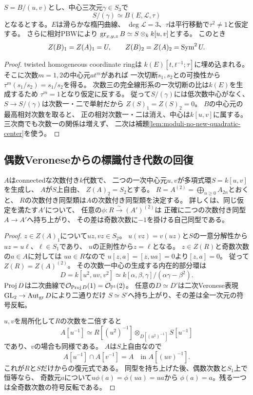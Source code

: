 \begin{lemma}
\label{lem:moduli-low-center}
$S=B/(u,v)$とし、中心三次元$\gamma\in S_3$で
\[
 S/(\gamma)\simeq B(E,\mathcal L,\tau)
\]
となるとする。$E$は滑らかな楕円曲線、
$\deg\mathcal L=3$、$\tau$は平行移動で$\tau^2\ne1$と仮定する。
さらに相対PBWにより
$\operatorname{gr}_{x,y,z} B\simeq S\otimes_k k[u,v]$とする。
このとき
\[
 Z(B)_1=Z(A)_1=U,\qquad
 Z(B)_2=Z(A)_2=\operatorname{Sym}^2U.
\]
\end{lemma}
\begin{proof}
twisted homogeneous coordinate ringは
$k(E)[t,t^{-1};\tau]$に埋め込まれる。
そこに次数$m=1,2$の中心元$at^m$があれば
一次切断$s_1,s_2$との可換性から
$\tau^m(s_1/s_2)=s_1/s_2$を得る。
次数三の完全線形系の一次切断の比は$k(E)$を生成するため
$\tau^m=1$となり仮定に反する。
従って$S/(\gamma)$には低次数中心がなく、
$S\to S/(\gamma)$は次数一・二で単射だから
$Z(S)_1=Z(S)_2=0$。
$B$の中心元の最高相対次数を取ると、
正の相対次数一・二は消え、中心は$k[u,v]$に属する。
三次商でも次数一の関係は増えず、
二次は補題\ref{lem:moduli-no-new-quadratic-center}を使う。
\end{proof}

\subsection{偶数Veroneseからの標識付き代数の回復}
\begin{lemma}[中心二変数の平方根と奇数部分]
\label{lem:moduli-even-veronese}
$A$はconnectedな次数付き$k$代数で、
二つの一次中心元$u,v$が多項式環$S=k[u,v]$を生成し、
$A$が$S$上自由、
$Z(A)_2=S_2$とする。
$R=A^{(2)}=\bigoplus_{n\ge0}A_{2n}$とおくと、
$R$の次数付き同型類は$A$の次数付き同型類を決定する。
詳しくは、同じ仮定を満たす$A'$について、
任意の$\phi:R\xrightarrow{\sim}(A')^{(2)}$は
正確に二つの次数付き同型$A\to A'$へ持ち上がり、
その差は奇数次数に$-1$を掛ける自己同型である。
\end{lemma}
\begin{proof}
$z\in Z(A)_1$について$uz,vz\in S_2$。
$u(vz)=v(uz)$と$S$の一意分解性から
$uz=u\ell$、$\ell\in S_1$であり、
$u$の正則性から$z=\ell$となる。
$z\in Z(R)$と奇数次数の$a\in A$に対しては
$ua\in R$なので
$u[z,a]=[z,ua]=0$より$[z,a]=0$。
従って$Z(R)=Z(A)^{(2)}$。
その次数一中心の生成する内在的部分環は
\[
 D=k[u^2,uv,v^2]
   \simeq k[\alpha,\beta,\gamma]/(\alpha\gamma-\beta^2).
\]
$\operatorname{Proj} D$は二次曲線で$\mathcal O_{\operatorname{Proj} D}(1)=\mathcal O_{\mathbb P^1}(2)$。
任意の$D\simeq D'$は二次Veronese表現
$\mathrm{GL}_2\to\operatorname{Aut}_{\operatorname{gr}}D$により二通りだけ
$S\simeq S'$へ持ち上がり、その差は全一次元の符号反転。

$u,v$を局所化して$R$の次数を二倍すると
\[
 A[u^{-1}]
  \simeq R[(u^2)^{-1}]
    \otimes_{D[(u^2)^{-1}]}S[u^{-1}]
\]
であり、$v$の場合も同様である。
$A$は$S$上自由なので
\[
 A[u^{-1}]\cap A[v^{-1}]=A
 \quad\text{in }A[(uv)^{-1}].
\]
これが$R$と$S$だけからの復元式である。
同型を持ち上げた後、偶数次数と$S_1$上で恒等なら、
奇数元$a$について$u\phi(a)=\phi(ua)=ua$から
$\phi(a)=a$。残る一つは全奇数次数の符号反転である。
\end{proof}

